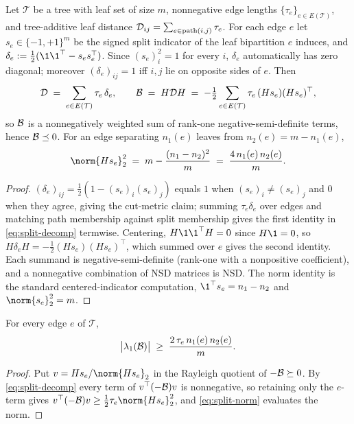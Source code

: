 \begin{lemma}\label{lem:split-decomp}
Let $\mathcal T$ be a tree with leaf set of size $m$, nonnegative edge lengths
$\{\tau_e\}_{e\in E(\mathcal T)}$, and tree-additive leaf distance
$\mathcal{D}_{ij}=\sum_{e\in\mathrm{path}(i,j)}\tau_e$. For each edge $e$ let
$s_e\in\{-1,+1\}^m$ be the signed split indicator of the leaf bipartition $e$
induces, and $\delta_e:=\tfrac12(\1\1^\top - s_es_e^\top)$. Since
$(s_e)_i^2=1$ for every $i$, $\delta_e$ automatically has zero diagonal;
moreover $(\delta_e)_{ij}=1$ iff $i,j$ lie on opposite sides of $e$. Then
\begin{equation}\label{eq:split-decomp}
   \mathcal{D} \;=\; \sum_{e\in E(\mathcal T)}\tau_e\,\delta_e,
   \qquad
   \mathcal{B} \;=\; H\mathcal{D} H
        \;=\; -\tfrac12\sum_{e\in E(\mathcal T)}\tau_e\,(Hs_e)(Hs_e)^\top,
\end{equation}
so $\mathcal{B}$ is a nonnegatively weighted sum of rank-one negative-semi-definite
terms, hence $\mathcal{B}\preceq0$. For an edge separating $n_1(e)$ leaves from
$n_2(e)=m-n_1(e)$,
\begin{equation}\label{eq:split-norm}
   \norm{Hs_e}_2^2 \;=\; m - \frac{(n_1-n_2)^2}{m} \;=\; \frac{4\,n_1(e)\,n_2(e)}{m}.
\end{equation}
\end{lemma}
\begin{proof}
$(\delta_e)_{ij}=\tfrac12(1-(s_e)_i(s_e)_j)$ equals $1$ when $(s_e)_i\ne(s_e)_j$
and $0$ when they agree, giving the cut-metric claim; summing $\tau_e\delta_e$
over edges and matching path membership against split membership gives the
first identity in \eqref{eq:split-decomp} termwise. Centering,
$H\1\1^\top H=0$ since $H\1=0$, so $H\delta_e H=-\tfrac12(Hs_e)(Hs_e)^\top$,
which summed over $e$ gives the second identity. Each summand is
negative-semi-definite (rank-one with a nonpositive coefficient), and a
nonnegative combination of NSD matrices is NSD. The norm identity is the
standard centered-indicator computation, $\1^\top s_e=n_1-n_2$ and
$\norm{s_e}_2^2=m$.
\end{proof}

\begin{lemma}\label{lem:dist-edge}
For every edge $e$ of $\mathcal T$,
\begin{equation}\label{eq:dist-edge}
   \bigl|\lambda_1(\mathcal{B})\bigr| \;\ge\; \frac{2\,\tau_e\,n_1(e)\,n_2(e)}{m}.
\end{equation}
\end{lemma}
\begin{proof}
Put $v=Hs_e/\norm{Hs_e}_2$ in the Rayleigh quotient of $-\mathcal{B}\succeq0$. By
\eqref{eq:split-decomp} every term of $v^\top(-\mathcal{B})v$ is nonnegative, so
retaining only the $e$-term gives
$v^\top(-\Bop)v\ge\tfrac12\tau_e\norm{Hs_e}_2^2$, and \eqref{eq:split-norm}
evaluates the norm.
\end{proof}


